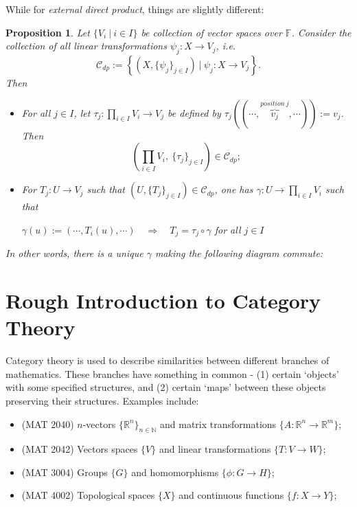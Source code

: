 \documentclass[11pt,openany]{book}
\theoremstyle{plain}
\newtheorem{proposition}[proposition]{Proposition}
\theoremstyle{definition}
\theoremstyle{remark}
\begin{document}
While for {\it external direct product}, things are slightly different:
\begin{proposition}
    Let $\{V_i\ |\ i \in I\}$ be collection of vector spaces over $\mathbb{F}$. Consider the collection of all linear transformations $\psi_j: X \to V_j$, i.e.
    $$\mathcal{C}_{dp} := \left\{(X, \{\psi_j\}_{j \in I})\ |\ \psi_j : X \to V_j \right\}.$$
    Then
    \begin{itemize}
        \item[(a)] For all $j \in I$, let $\tau_j: \prod_{i \in I} V_i \to V_j$ be defined by $\tau_j((\cdots, \overbrace{v_j}^{position\ j}, \cdots)) := v_j$. Then
        $$\left(\prod_{i \in I} V_i,\ \{\tau_j\}_{j \in I} \right) \in \mathcal{C}_{dp};$$
        \item[(b)] For $T_j: U \to V_j$ such that $(U, \{T_j\}_{j \in I}) \in \mathcal{C}_{dp}$, one has $\gamma: U \to \prod_{i \in I} V_i$  such that
        \begin{center}
        $\gamma(u) := (\cdots, T_i(u), \cdots) \quad \Rightarrow \quad T_j = \tau_j \circ \gamma$ for all $j \in I$
        \end{center}
    \end{itemize}
In other words, there is a unique $\gamma$ making the following diagram commute:
\begin{center}
\end{center}
\end{proposition}

\section{Rough Introduction to Category Theory} \label{sec-univ}
Category theory is used to describe similarities between different branches of mathematics. These branches have something in common - (1) certain `objects' with some specified structures, and (2) certain `maps' between these objects preserving their structures. Examples include:
\begin{itemize}
    \item(MAT 2040) $n$-vectors $\{\mathbb{R}^n\}_{n \in \mathbb{N}}$ and matrix transformations $\{A: \mathbb{R}^n \to \mathbb{R}^m\}$;
    \item(MAT 2042) Vectors spaces $\{V\}$ and linear transformations $\{T: V \to W\}$;
    \item(MAT 3004) Groups $\{G\}$ and homomorphisms $\{\phi: G \to H\}$;
    \item(MAT 4002) Topological spaces $\{X\}$ and continuous functions $\{f: X \to Y\}$;
\end{itemize}
\end{document}
